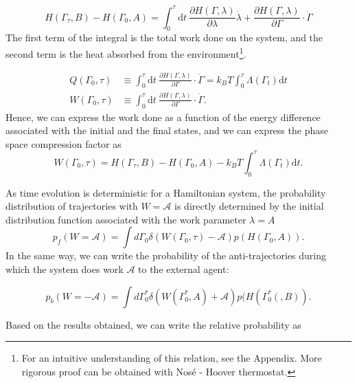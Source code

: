 \documentclass[ reprint, amsmath,amssymb, aps,]{revtex4-1}
\begin{document}
\begin{equation}
H(\Gamma_\tau,B)-H(\Gamma_0, A)=\int_0^\tau \mathrm{d}t \ \frac{\partial H(\Gamma,\lambda)}{\partial\lambda}\dot\lambda +\frac{\partial H(\Gamma,\lambda)}{\partial{\Gamma}}\cdot\dot{\Gamma}
\end{equation}
The first term of the integral is the total work done on the system, and the second term is the heat absorbed from the environment\footnote{For an intuitive understanding of this relation, see the Appendix. More rigorous proof can be obtained with Nos\'e - Hoover thermostat.}.

\begin{align}
Q(\Gamma_0,\tau)&\equiv\int_0^\tau\mathrm{d}t\  \frac{\partial H(\Gamma,\lambda)}{\partial{\Gamma}}\cdot\dot{\Gamma}=k_BT\int_0^\tau
\Lambda(\Gamma_t) \mathrm{d}t\\
W(\Gamma_0,\tau)&\equiv \int_0^\tau\mathrm{d}t\ \frac{\partial H(\Gamma,\lambda)}{\partial\Gamma}\cdot\dot\Gamma.
\end{align}
Hence, we can express the work done as a function of the energy difference associated with the initial and the final states, and we can express the phase space compression factor as
\begin{equation}\label{eq:work_relation}
W(\Gamma_0,\tau)=H(\Gamma_\tau,B)-H(\Gamma_0, A)-k_BT\int_0^\tau\Lambda(\Gamma_t)\mathrm{d}t.
\end{equation}
 
As time evolution is deterministic for a Hamiltonian system, the probability distribution of trajectories with $W=\mathcal{A}$ is directly determined by the initial distribution function associated with the work parameter $\lambda=A$
\begin{equation}\label{eq:pf}
p_f(W=\mathcal{A})
=\int d\Gamma_0\delta(W(\Gamma_0,\tau)-\mathcal{A}) p(H(\Gamma_0,A)).
\end{equation}
In the same way, we can write the probability of the anti-trajectories during which the system does work $\mathcal{A}$ to the external agent:

\begin{equation}\label{eq:pb}
p_b(W=-\mathcal{A})=\int d\Gamma_0^*\delta(W(\Gamma_0^*,A)+\mathcal{A}) p(H(\Gamma_0^*(,B)).
\end{equation}


Based on the results obtained, we can write the relative probability as
\end{document}
